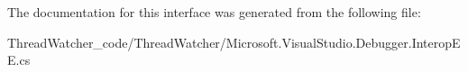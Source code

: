 The documentation for this interface was generated from the following file\+:\begin{DoxyCompactItemize}
\item 
Thread\+Watcher\+\_\+code/\+Thread\+Watcher/Microsoft.\+Visual\+Studio.\+Debugger.\+Interop\+E\+E.\+cs\end{DoxyCompactItemize}
